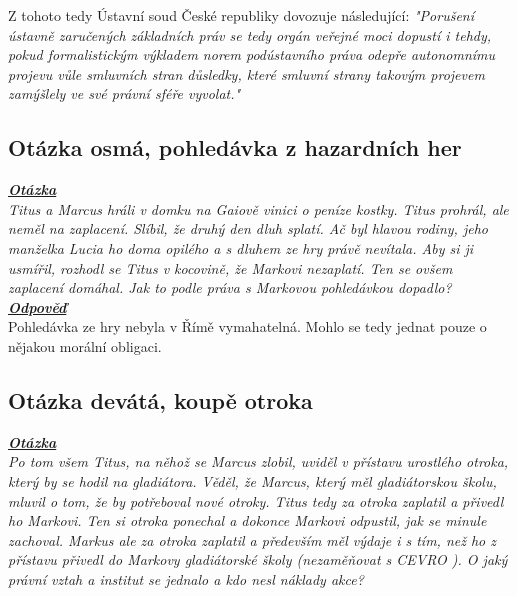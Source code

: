 \documentclass{article}
\begin{document}
Z tohoto tedy Ústavní soud České republiky dovozuje následující: \textit{"Porušení ústavně zaručených základních práv se tedy orgán veřejné moci dopustí i tehdy, pokud formalistickým výkladem norem podústavního práva odepře autonomnímu projevu vůle smluvních stran důsledky, které smluvní strany takovým projevem zamýšlely ve své právní sféře vyvolat."}\\



\subsection{Otázka osmá, pohledávka z hazardních her}
\textbf{\textit{\underline{Otázka}}}\\
\textit{Titus a Marcus hráli v domku na Gaiově vinici o peníze kostky. Titus prohrál, ale neměl na zaplacení. Slíbil, že druhý den dluh splatí. Ač byl hlavou rodiny, jeho manželka Lucia ho doma opilého a s dluhem ze hry právě nevítala. Aby si ji usmířil, rozhodl se Titus v kocovině, že Markovi nezaplatí. Ten se ovšem zaplacení domáhal. Jak to podle práva s Markovou pohledávkou dopadlo?}\\

\noindent\noindent\textbf{\textit{\underline{Odpověď}}}\\

Pohledávka ze hry nebyla v Římě vymahatelná. Mohlo se tedy jednat pouze o nějakou morální obligaci.

\subsection{Otázka devátá, koupě otroka}
\textbf{\textit{\underline{Otázka}}}\\
\textit{Po tom všem Titus, na něhož se Marcus zlobil, uviděl v přístavu urostlého otroka, který by se hodil na gladiátora. Věděl, že Marcus, který měl gladiátorskou školu, mluvil o tom, že by potřeboval nové otroky. Titus tedy za otroka zaplatil a přivedl ho Markovi. Ten si otroka ponechal a dokonce Markovi odpustil, jak se minule zachoval. Markus ale za otroka zaplatil a především měl výdaje i s tím, než ho z přístavu přivedl do Markovy gladiátorské školy (nezaměňovat s CEVRO ). O jaký právní vztah a institut se jednalo a kdo nesl náklady akce?}\\
\end{document}

